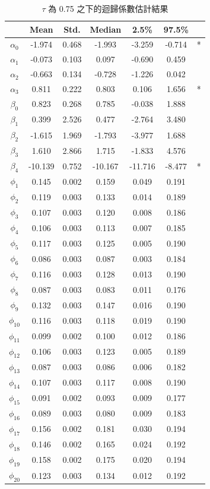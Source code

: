 \documentclass[12pt,a4paper]{article}
\begin{document}
\begin{CJK}{UTF8}{bkai}
\begin{table}
\centering
\setlength{\belowcaptionskip}{0.5cm}
\caption{$\tau$ 為 0.75 之下的迴歸係數估計結果}
\begin{tabular}{ccccccc}
\hline
& Mean & Std.& Median & 2.5\% & 97.5\% &\\
\hline
$\alpha_0$ & -1.974 & 0.468 & -1.993 & -3.259 & -0.714 & *\\
$\alpha_1$ & -0.073 & 0.103 &  0.097 & -0.690 &  0.459 &  \\
$\alpha_2$ & -0.663 & 0.134 & -0.728 & -1.226 &  0.042 &  \\
$\alpha_3$ &  0.811 & 0.222 &  0.803 &  0.106 &  1.656 & *\\
$\beta_0$  &  0.823 & 0.268 &  0.785 & -0.038 &  1.888 &  \\
$\beta_1$  &  0.399 & 2.526 &  0.477 & -2.764 &  3.480 &  \\
$\beta_2$  & -1.615 & 1.969 & -1.793 & -3.977 &  1.688 &  \\
$\beta_3$  &  1.610 & 2.866 &  1.715 & -1.833 &  4.576 &  \\
$\beta_4$  &-10.139 & 0.752 &-10.167 &-11.716 & -8.477 & *\\
\hline
$ \phi_1$   & 0.145 & 0.002 & 0.159 & 0.049 & 0.191 & \\
$ \phi_2$   & 0.119 & 0.003 & 0.133 & 0.014 & 0.189 & \\
$ \phi_3$   & 0.107 & 0.003 & 0.120 & 0.008 & 0.186 & \\
$ \phi_4$   & 0.106 & 0.003 & 0.113 & 0.007 & 0.185 & \\
$ \phi_5$   & 0.117 & 0.003 & 0.125 & 0.005 & 0.190 & \\
$ \phi_6$   & 0.086 & 0.003 & 0.087 & 0.003 & 0.184 & \\
$ \phi_7$   & 0.116 & 0.003 & 0.128 & 0.013 & 0.190 & \\
$ \phi_8$   & 0.087 & 0.003 & 0.083 & 0.011 & 0.176 & \\
$ \phi_9$   & 0.132 & 0.003 & 0.147 & 0.016 & 0.190 & \\
$\phi_{10}$ & 0.116 & 0.003 & 0.118 & 0.019 & 0.190 & \\
$\phi_{11}$ & 0.099 & 0.002 & 0.100 & 0.012 & 0.186 & \\
$\phi_{12}$ & 0.106 & 0.003 & 0.123 & 0.005 & 0.189 & \\
$\phi_{13}$ & 0.087 & 0.003 & 0.086 & 0.006 & 0.182 & \\
$\phi_{14}$ & 0.107 & 0.003 & 0.117 & 0.008 & 0.190 & \\
$\phi_{15}$ & 0.091 & 0.002 & 0.093 & 0.009 & 0.177 & \\
$\phi_{16}$ & 0.089 & 0.003 & 0.080 & 0.009 & 0.183 & \\
$\phi_{17}$ & 0.156 & 0.002 & 0.181 & 0.030 & 0.194 & \\
$\phi_{18}$ & 0.146 & 0.002 & 0.165 & 0.024 & 0.192 & \\
$\phi_{19}$ & 0.158 & 0.002 & 0.175 & 0.020 & 0.194 & \\
$\phi_{20}$ & 0.123 & 0.003 & 0.134 & 0.012 & 0.192 & \\


\end{tabular}
\end{table}
\end{CJK}
\end{document}
